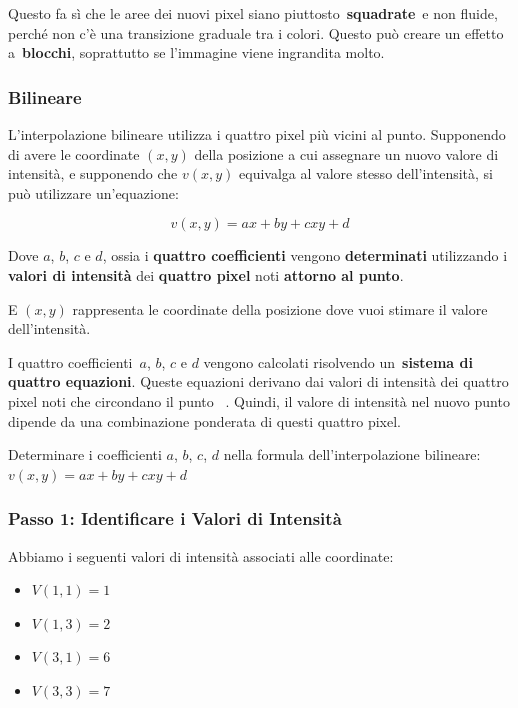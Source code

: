 Questo fa sì che le aree dei nuovi pixel siano
piuttosto~\textbf{squadrate}~e non fluide, perché non c'è una
transizione graduale tra i colori. Questo può creare un effetto
a~\textbf{blocchi}, soprattutto se l'immagine viene ingrandita molto.

\subsubsection{Bilineare}\label{bilineare}

L'interpolazione bilineare utilizza i quattro pixel più vicini al punto.
Supponendo di avere le coordinate \((x,y)\) della posizione a cui
assegnare un nuovo valore di intensità, e supponendo che \(v(x,y)\)
equivalga al valore stesso dell'intensità, si può utilizzare
un'equazione:

\[
v(x,y) = ax + by +cxy+d
\]

Dove \(a\), \(b\), \(c\) e \(d\), ossia i \textbf{quattro coefficienti}
vengono \textbf{determinati} utilizzando i \textbf{valori di intensità}
dei \textbf{quattro pixel} noti \textbf{attorno al punto}.

E \((x, y)\) rappresenta le coordinate della posizione dove vuoi stimare
il valore dell'intensità.

I quattro coefficienti~\(a\), \(b\), \(c\) e \(d\) vengono calcolati
risolvendo un~\textbf{sistema di quattro equazioni}. Queste equazioni
derivano dai valori di intensità dei quattro pixel noti che circondano
il punto~ . Quindi, il valore di intensità nel nuovo punto dipende da
una combinazione ponderata di questi quattro pixel.

Determinare i coefficienti \(a\), \(b\), \(c\), \(d\) nella formula
dell'interpolazione bilineare: \(v(x, y) = ax + by + cxy + d\)

\subsubsection{Passo 1: Identificare i Valori di
Intensità}\label{passo-1-identificare-i-valori-di-intensituxe0}

Abbiamo i seguenti valori di intensità associati alle coordinate:

\begin{itemize}
\tightlist
\item
  \(V(1, 1) = 1\)
\item
  \(V(1, 3) = 2\)
\item
  \(V(3, 1) = 6\)
\item
  \(V(3, 3) = 7\)
\end{itemize}

